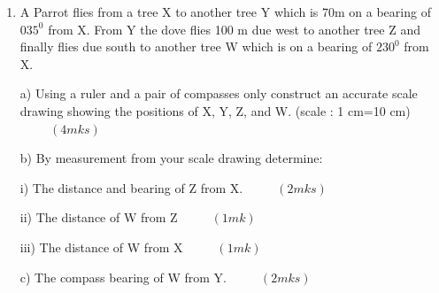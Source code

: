 \documentclass[
  a4paperpaper,
]{scrbook}
\begin{document}
\begin{tcolorbox}
\begin{enumerate}
\def\labelenumi{\arabic{enumi}.}
\setcounter{enumi}{20}
\item
  A Parrot flies from a tree X to another tree Y which is 70m on a
  bearing of \(035^0\) from X. From Y the dove flies 100 m due west to
  another tree Z and finally flies due south to another tree W which is
  on a bearing of \(230^0\) from X.

  a) Using a ruler and a pair of compasses only construct an accurate
  scale drawing showing the positions of X, Y, Z, and W. (scale : 1
  cm=10 cm) \(\hspace{1cm} (4mks)\)

  b) By measurement from your scale drawing determine:

  i) The distance and bearing of Z from X. \(\hspace{1cm} (2mks)\)

  ii) The distance of W from Z \(\hspace{1cm} (1mk)\)

  iii) The distance of W from X \(\hspace{1cm} (1mk)\)

  c) The compass bearing of W from Y. \(\hspace{1cm} (2mks)\)
\end{enumerate}

\end{tcolorbox}
\end{document}
